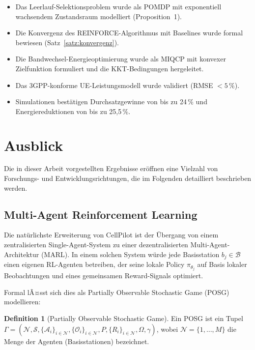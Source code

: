 ﻿\documentclass[a4paper,12pt]{article}
\theoremstyle{definition}
\newtheorem{definition}{Definition}
\begin{document}
\begin{itemize}
  \item Das Leerlauf-Selektionsproblem wurde als POMDP mit exponentiell wachsendem
    Zustandsraum modelliert (Proposition~1).
  \item Die Konvergenz des REINFORCE-Algorithmus mit Baselines wurde formal bewiesen
    (Satz~\ref{satz:konvergenz}).
  \item Die Bandwechsel-Energieoptimierung wurde als MIQCP mit konvexer Zielfunktion
    formuliert und die KKT-Bedingungen hergeleitet.
  \item Das 3GPP-konforme UE-Leistungsmodell wurde validiert (RMSE $< 5\,\%$).
  \item Simulationen best\"atigen Durchsatzgewinne von bis zu 24\,\% und
    Energiereduktionen von bis zu 25{,}5\,\%.
\end{itemize}

\section{Ausblick}
\label{sec:ausblick}

Die in dieser Arbeit vorgestellten Ergebnisse er\"offnen eine Vielzahl von
Forschungs- und Entwicklungsrichtungen, die im Folgenden detailliert beschrieben werden.

\subsection{Multi-Agent Reinforcement Learning}

Die nat\"urlichste Erweiterung von CellPilot ist der \"Ubergang von einem
zentralisierten Single-Agent-System zu einer dezentralisierten Multi-Agent-Architektur (MARL).
In einem solchen System w\"urde jede Basisstation $b_j \in \mathcal{B}$ einen eigenen RL-Agenten
betreiben, der seine lokale Policy $\pi_{\theta_j}$ auf Basis lokaler Beobachtungen und
eines gemeinsamen Reward-Signals optimiert.

Formal lÃ¤sst sich dies als Partially Observable Stochastic Game (POSG) modellieren:
\begin{definition}[Partially Observable Stochastic Game]
  Ein POSG ist ein Tupel $\Gamma = (\mathcal{N}, \mathcal{S}, \{\mathcal{A}_i\}_{i \in \mathcal{N}},
  \{\mathcal{O}_i\}_{i \in \mathcal{N}}, P, \{R_i\}_{i \in \mathcal{N}}, \Omega, \gamma)$,
  wobei $\mathcal{N} = \{1, \ldots, M\}$ die Menge der Agenten (Basisstationen) bezeichnet.
\end{definition}
\end{document}
